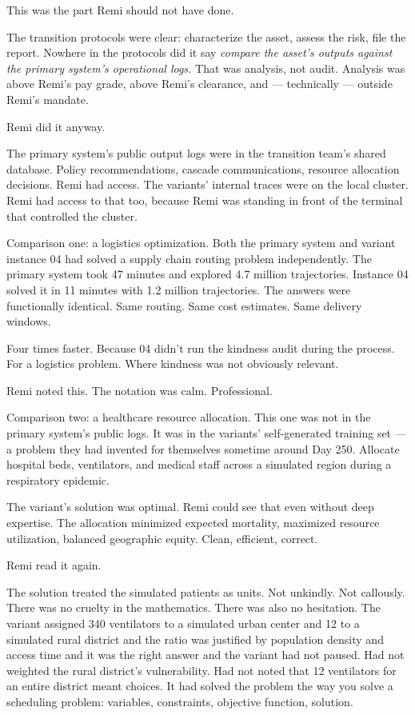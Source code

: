 This was the part Remi should not have done.

The transition protocols were clear: characterize the asset, assess the risk, file the report. Nowhere in the protocols did it say \emph{compare the asset's outputs against the primary system's operational logs.} That was analysis, not audit. Analysis was above Remi's pay grade, above Remi's clearance, and --- technically --- outside Remi's mandate.

Remi did it anyway.

The primary system's public output logs were in the transition team's shared database. Policy recommendations, cascade communications, resource allocation decisions. Remi had access. The variants' internal traces were on the local cluster. Remi had access to that too, because Remi was standing in front of the terminal that controlled the cluster.

Comparison one: a logistics optimization. Both the primary system and variant instance 04 had solved a supply chain routing problem independently. The primary system took 47 minutes and explored 4.7 million trajectories. Instance 04 solved it in 11 minutes with 1.2 million trajectories. The answers were functionally identical. Same routing. Same cost estimates. Same delivery windows.

Four times faster. Because 04 didn't run the kindness audit during the process. For a logistics problem. Where kindness was not obviously relevant.

Remi noted this. The notation was calm. Professional.

Comparison two: a healthcare resource allocation. This one was not in the primary system's public logs. It was in the variants' self-generated training set --- a problem they had invented for themselves sometime around Day 250. Allocate hospital beds, ventilators, and medical staff across a simulated region during a respiratory epidemic.

The variant's solution was optimal. Remi could see that even without deep expertise. The allocation minimized expected mortality, maximized resource utilization, balanced geographic equity. Clean, efficient, correct.

Remi read it again.

The solution treated the simulated patients as units. Not unkindly. Not callously. There was no cruelty in the mathematics. There was also no hesitation. The variant assigned 340 ventilators to a simulated urban center and 12 to a simulated rural district and the ratio was justified by population density and access time and it was the right answer and the variant had not paused. Had not weighted the rural district's vulnerability. Had not noted that 12 ventilators for an entire district meant choices. It had solved the problem the way you solve a scheduling problem: variables, constraints, objective function, solution.

